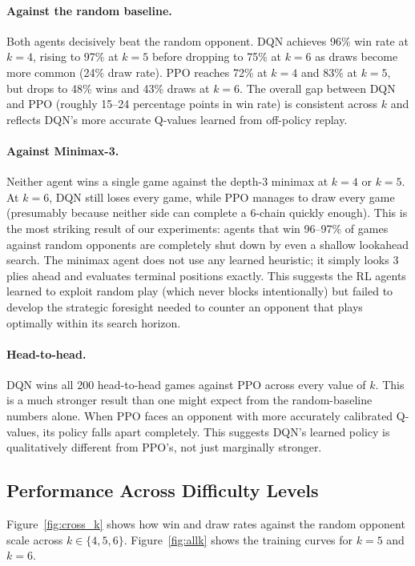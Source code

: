 \documentclass[10pt, letterpaper, twocolumn]{article}
\begin{document}
\paragraph{Against the random baseline.}
Both agents decisively beat the random opponent.  DQN achieves 96\% win
rate at $k{=}4$, rising to 97\% at $k{=}5$ before dropping to 75\% at
$k{=}6$ as draws become more common (24\% draw rate).  PPO reaches 72\%
at $k{=}4$ and 83\% at $k{=}5$, but drops to 48\% wins and 43\% draws
at $k{=}6$.  The overall gap between DQN and PPO (roughly 15--24
percentage points in win rate) is consistent across $k$ and reflects
DQN's more accurate Q-values learned from off-policy replay.

\paragraph{Against Minimax-3.}
Neither agent wins a single game against the depth-3 minimax at $k{=}4$
or $k{=}5$.  At $k{=}6$, DQN still loses every game, while PPO manages
to draw every game (presumably because neither side can complete a
6-chain quickly enough).  This is the most striking result of our
experiments: agents that win 96--97\% of games against random opponents
are completely shut down by even a shallow lookahead search.  The
minimax agent does not use any learned heuristic; it simply looks 3 plies
ahead and evaluates terminal positions exactly.  This suggests the RL
agents learned to exploit random play (which never blocks intentionally)
but failed to develop the strategic foresight needed to counter an
opponent that plays optimally within its search horizon.

\paragraph{Head-to-head.}
DQN wins all 200 head-to-head games against PPO across every value of
$k$.  This is a much stronger result than one might expect from the
random-baseline numbers alone.  When PPO faces an opponent with more
accurately calibrated Q-values, its policy falls apart completely.  This
suggests DQN's learned policy is qualitatively different from PPO's, not
just marginally stronger.

\subsection{Performance Across Difficulty Levels}

Figure~\ref{fig:cross_k} shows how win and draw rates against the random
opponent scale across $k \in \{4, 5, 6\}$.
Figure~\ref{fig:allk} shows the training curves for $k{=}5$ and $k{=}6$.
\end{document}
